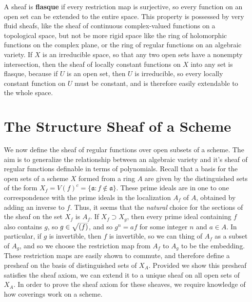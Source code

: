 A sheaf is {\bf flasque} if every restriction map is surjective, so every function on an open set can be extended to the entire space. This property is possessed by very fluid sheafs, like the sheaf of continuous complex-valued functions on a topological space, but not be more rigid space like the ring of holomorphic functions on the complex plane, or the ring of regular functions on an algebraic variety. If $X$ is an irreducible space, so that any two open sets have a nonempty intersection, then the sheaf of locally constant functions on $X$ into any set is flasque, because if $U$ is an open set, then $U$ is irreducible, so every locally constant function on $U$ must be constant, and is therefore easily extendable to the whole space.

\section{The Structure Sheaf of a Scheme}

We now define the sheaf of regular functions over open subsets of a scheme. The aim is to generalize the relationship between an algebraic variety and it's sheaf of regular functions definable in terms of polynomials. Recall that a basis for the open sets of a scheme $X$ formed from a ring $A$ are given by the distinguished sets of the form $X_f = V(f)^c = \{ \mathfrak{a}: f \not \in \mathfrak{a} \}$. These prime ideals are in one to one correspondence with the prime ideals in the localization $A_f$ of $A$, obtained by adding an inverse to $f$. Thus, it seems that the {\it natural} choice for the sections of the sheaf on the set $X_f$ is $A_f$. If $X_f \supset X_g$, then every prime ideal containing $f$ also contains $g$, so $g \in \smash{\sqrt{(f)}}$, and so $g^n = af$ for some integer $n$ and $a \in A$. In particular, if $g$ is invertible, then $f$ is invertible, so we can thing of $A_f$ as a subset of $A_g$, and so we choose the restriction map from $A_f$ to $A_g$ to be the embedding. These restriction maps are easily shown to commute, and therefore define a presheaf on the basis of distinguished sets of $X_A$. Provided we show this presheaf satisfies the sheaf axiom, we can extend it to a unique sheaf on all open sets of $X_A$. In order to prove the sheaf axiom for these sheaves, we require knowledge of how coverings work on a scheme.

